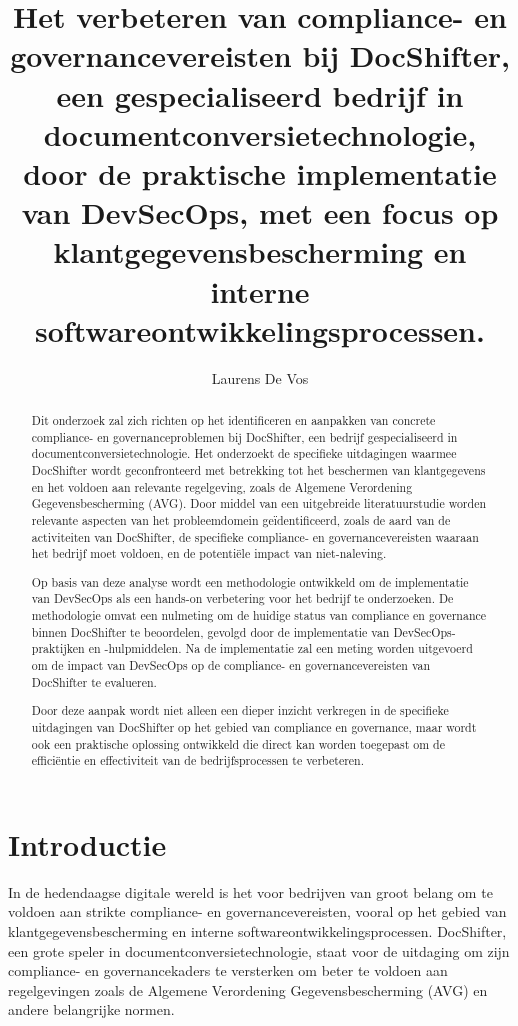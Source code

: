 \documentclass{hogent-article}
\title{Het verbeteren van compliance- en governancevereisten bij DocShifter, een gespecialiseerd bedrijf in documentconversietechnologie, door de praktische implementatie van DevSecOps, met een focus op klantgegevensbescherming en interne softwareontwikkelingsprocessen.}
\author{Laurens De Vos}
\begin{document}
    
    \begin{abstract}
    Dit onderzoek zal zich richten op het identificeren en aanpakken van concrete compliance- en governanceproblemen bij DocShifter, een bedrijf gespecialiseerd in documentconversietechnologie. Het onderzoekt de specifieke uitdagingen waarmee DocShifter wordt geconfronteerd met betrekking tot het beschermen van klantgegevens en het voldoen aan relevante regelgeving, zoals de Algemene Verordening Gegevensbescherming (AVG). Door middel van een uitgebreide literatuurstudie worden relevante aspecten van het probleemdomein geïdentificeerd, zoals de aard van de activiteiten van DocShifter, de specifieke compliance- en governancevereisten waaraan het bedrijf moet voldoen, en de potentiële impact van niet-naleving.
    
    Op basis van deze analyse wordt een methodologie ontwikkeld om de implementatie van DevSecOps als een hands-on verbetering voor het bedrijf te onderzoeken. De methodologie omvat een nulmeting om de huidige status van compliance en governance binnen DocShifter te beoordelen, gevolgd door de implementatie van DevSecOps-praktijken en -hulpmiddelen. Na de implementatie zal een meting worden uitgevoerd om de impact van DevSecOps op de compliance- en governancevereisten van DocShifter te evalueren.
    
    Door deze aanpak wordt niet alleen een dieper inzicht verkregen in de specifieke uitdagingen van DocShifter op het gebied van compliance en governance, maar wordt ook een praktische oplossing ontwikkeld die direct kan worden toegepast om de efficiëntie en effectiviteit van de bedrijfsprocessen te verbeteren. 
    
    \end{abstract}
    
    \tableofcontents
    
    
    \section{Introductie}%
    \label{sec:introductie}
    In de hedendaagse digitale wereld is het voor bedrijven van groot belang om te voldoen aan strikte compliance- en governancevereisten, vooral op het gebied van klantgegevensbescherming en interne softwareontwikkelingsprocessen. DocShifter, een grote speler in documentconversietechnologie, staat voor de uitdaging om zijn \\ compliance- en governancekaders te versterken om beter te voldoen aan regelgevingen zoals de Algemene Verordening Gegevensbescherming (AVG) en andere belangrijke normen.
    
\end{document}
